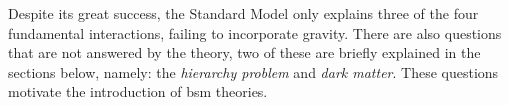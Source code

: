 Despite its great success, the Standard Model only explains three of the four
fundamental interactions, failing to incorporate gravity. There are also
questions that are not answered by the theory, two of these are briefly
explained in the sections below, namely: the \emph{hierarchy problem} and
\emph{dark matter}. These questions motivate the introduction of \gls{bsm}
theories.
